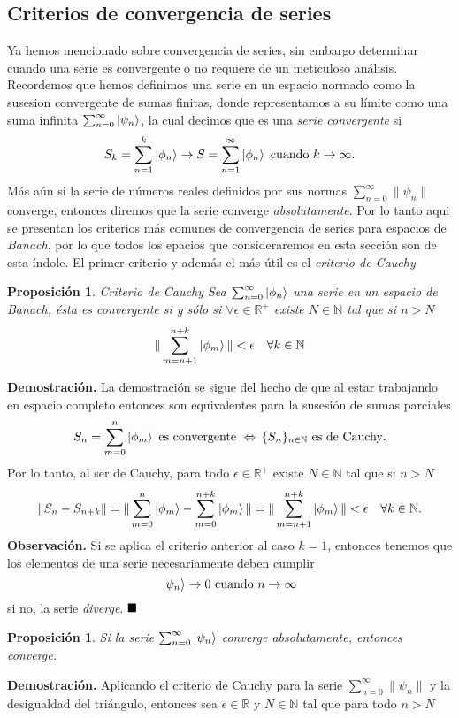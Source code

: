 \documentclass[letterpaper]{book}
\newtheorem{prop}[teorema]{Proposici\'on}
\newcommand{\nat}{\ensuremath{ \mathbb N }}
\newcommand{\obs}{{\noindent \sc \textbf{Observación. }}}
\newcommand{\dem}{{\noindent \sc \textbf{Demostraci\'on. }}}
\newcommand{\QED}{\ensuremath{\hspace*{0em plus 1fill}\blacksquare}}
\newcommand{\re}{\ensuremath{\mathbb R }}
\begin{document}
\subsection{Criterios de convergencia de series}
\noindent Ya hemos mencionado sobre convergencia de series, sin embargo determinar cuando una serie es convergente o no requiere de un meticuloso análisis. Recordemos que hemos definimos una serie en un espacio normado como la susesion convergente de sumas finitas, donde representamos a su límite como una suma infinita \(\sum_{n=0}^{\infty}\ket{\psi_n}\), la cual decimos que es una \emph{serie convergente} si
\[
    S_k=\sum_{n=1}^k\ket{\phi_n}\rightarrow S=\sum_{n=1}^{\infty}\ket{\phi_n}\text{ cuando }k\rightarrow\infty.
\]
\noindent Más aún si la serie de números reales definidos por sus normas  \(\sum_{n=0}^{\infty}\|\psi_n\|\) converge, entonces diremos que la serie converge \emph{absolutamente}.
Por lo tanto aqui se presentan los criterios más comunes de convergencia de series para espacios de \emph{Banach}, por lo que todos los epacios que consideraremos en esta sección son de esta índole. El primer criterio y además el más útil es el \emph{criterio de Cauchy}
\begin{prop}{Criterio de Cauchy}
  Sea \(\sum_{n=0}^{\infty}\ket{\phi_n}\) una serie en un espacio de Banach, ésta es convergente si y sólo si \(\forall\epsilon\in\re^{+}\) existe \(N\in\nat\) tal que si \(n>N\)
  \[
    \|\sum_{m=n+1}^{n+k}\ket{\phi_m}\|<\epsilon\quad\forall k\in\nat
  \]
\end{prop}
\dem La demostración se sigue del hecho de que al estar trabajando en espacio completo entonces son equivalentes para la susesión de sumas parciales
\[
    S_n=\sum_{m=0}^{n}\ket{\phi_m}\text{ es convergente }\Leftrightarrow\,\{S_n\}_{n\in\nat}\text{ es de Cauchy}.
\]
\noindent Por lo tanto, al ser de Cauchy, para todo \(\epsilon\in\re^{+}\) existe \(N\in\nat\) tal que si \(n>N\)
\[
   \|S_n-S_{n+k}\|=\|\sum_{m=0}^{n}\ket{\phi_m}-\sum_{m=0}^{n+k}\ket{\phi_m}\|=\|\sum_{m=n+1}^{n+k}\ket{\phi_m}\|<\epsilon\quad\forall k\in\nat.
\]
\obs Si se aplica el criterio anterior al caso \(k=1\), entonces tenemos que los elementos de una serie necesariamente deben cumplir
\[
    \ket{\psi_n}\rightarrow 0\text{ cuando } n\to\infty
\]
si no, la serie \emph{diverge}.
\QED
\begin{prop}
  Si la serie \(\sum_{n=0}^{\infty}\ket{\psi_n}\) converge absolutamente, entonces converge.
  \end{prop}
\dem Aplicando el criterio de Cauchy para la serie \(\sum_{n=0}^{\infty}\|\psi_n\|\) y la desigualdad del triángulo, entonces sea \(\epsilon\in\re\) y \(N\in\nat\) tal que para todo \(n>N\)
\end{document}
